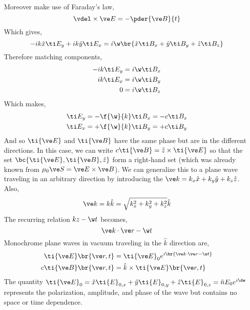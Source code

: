 \documentclass{article}
\begin{document}
Moreover make use of Faraday's law,
\[ \vdel \times \ve E = - \pder{\ve B}{t} \]
Which gives,
\[ - i k \hat x \ti E_y + i k \hat y \ti E_x = i \w \br{ \hat x \ti B_x + \hat y \ti B_y + \hat z \ti B_z} \]
Therefore matching components,
\begin{align*}
    -i k \ti E_y &= i \w \ti B_x \\
    i k \ti E_x &= i \w \ti B_y \\
    0 &= i \w \ti B_z
\end{align*}
Which makes,
\begin{align*}
    \ti E_y &= - \f{\w}{k} \ti B_x = - c \ti B_x \\
    \ti E_x &= + \f{\w}{k} \ti B_y = + c \ti B_y
\end{align*}
And so $\ti{\ve E}$ and $\ti{\ve B}$ have the same phase but are in the different directions. In this case, we can write $c \ti{\ve B} = \hat z \times \ti{\ve E}$ so that the set $\bc{\ti{\ve E} , \ti{\ve B} , \hat z}$ form a right-hand set (which was already known from $\mu_0 \ve S = \ve E \times \ve B$). We can generalize this to a plane wave traveling in an arbitrary direction by introducing the  $\ve k = k_x \hat x + k_y \hat y + k_z \hat z$. Also,
\[ \ve k = k \hat k = \sqrt{k_x^2 + k_y^2 + k_z^2} \hat k \]
The recurring relation $k z - \w t$ becomes,
\[ \ve k \cdot \ve r - \w t  \]
Monochrome plane waves in vacuum traveling in the $\hat k$ direction are,
\begin{align*}
\ti{\ve E}\br{\ve r , t} &= \ti{\ve E}_0 e^{i\br{\ve k \cdot \ve r - \w t}} \\
c\ti{\ve B}\br{\ve r , t} &= \hat k \times \ti{\ve E}\br{\ve r , t}
\end{align*}
The quantity $\ti{\ve E}_0 = \hat x \ti{E}_{0,x} + \hat y \ti{E}_{0,y} + \hat z \ti{E}_{0,z} = \hat n E_0 e^{i \de}$ represents the polarization, amplitude, and phase of the wave but contains no space or time dependence.
\end{document}
